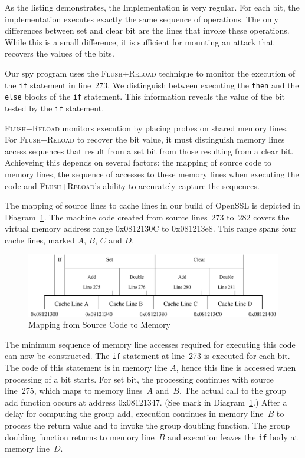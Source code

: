 \documentclass{llncs}
\begin{document}
As the listing demonstrates, the Implementation is very regular.
For each bit, the implementation executes exactly the same sequence of operations.
The only differences between set and clear bit are the lines that invoke these operations.
While this is a small difference, it is sufficient for mounting an attack that recovers 
the values of the bits.


Our spy program uses the \textsc{Flush+Reload} technique to monitor the execution of the \texttt{if}
statement in line~273.
We distinguish between executing the \texttt{then} and the \texttt{else} blocks of the \texttt{if}
statement.
This information reveals the value of the bit tested by the \texttt{if} statement.

\textsc{Flush+Reload} monitors execution by placing probes on shared memory lines.
For \textsc{Flush+Reload} to recover the bit value, it must distinguish memory lines access sequences
that result from a set bit from those resulting from a clear bit.
Achieveing this depends on several factors: the mapping of source code to memory lines, 
the sequence of accesses to these memory lines when executing the code and 
\textsc{Flush+Reload}'s ability to accurately capture the sequences.


The mapping of source lines to cache lines in our build of OpenSSL is depicted in Diagram~\ref{dgm:memory}.
The machine code created from source lines~273 to~282 covers the virtual memory address range 0x0812130C
to 0x081213e8.
This range spans four cache lines, marked $A$, $B$, $C$ and $D$.


\begin{figure}[htb]
\centering\includegraphics[width=\columnwidth]{images/memory}
\caption{Mapping from Source Code to Memory\label{dgm:memory}}
\end{figure}


The minimum sequence of memory line accesses required for executing this code can now be constructed.
The \texttt{if} statement at line~273 is executed for each bit.  
The code of this statement is in memory line $A$, hence this line is accessed when processing of a bit starts.
For set bit, the processing continues with source line~275, which maps to memory lines~$A$ and~$B$.
The actual call to the group add function occurs at address 0x08121347.
(See mark in Diagram~\ref{dgm:memory}.)
After a delay for computing the group add, execution continues in memory line~$B$ to process the return value and 
to invoke the group doubling function.
The group doubling function returns to memory line~$B$ and execution leaves the \texttt{if} body at memory line~$D$.
\end{document}
